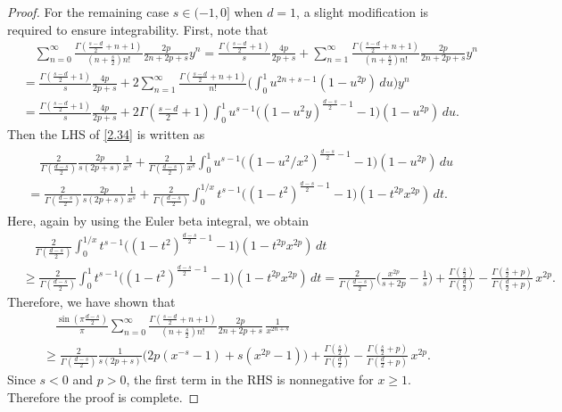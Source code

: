 \documentclass[10pt,a4paper]{amsart}
\begin{document}
\begin{proof}
For the remaining case $s \in (-1,0]$ when $d=1$, a slight modification is required to ensure integrability. First, note that 
\begin{align*}
&\quad \sum_{n=0}^\infty \frac{  \Gamma( \frac{s-d}{2}+n+1 )  }{  (n+\frac{s}{2}) n! }   \frac{2p}{2n+2p+s} y^{n} = \frac{  \Gamma( \frac{s-d}{2}+1 )  }{  s }   \frac{4p}{2p+s}+  \sum_{n=1}^\infty \frac{  \Gamma( \frac{s-d}{2}+n+1 )  }{  (n+\frac{s}{2}) n! }   \frac{2p}{2n+2p+s} y^{n} 
\\
&= \frac{  \Gamma( \frac{s-d}{2}+1 )  }{  s }   \frac{4p}{2p+s}+  2\sum_{n=1}^\infty \frac{  \Gamma( \frac{s-d}{2}+n+1 )  }{    n! }  \bigg(\int_0^1 u^{2n+s-1}(1-u^{2p})\,du \bigg)  y^n
\\
&=\frac{  \Gamma( \frac{s-d}{2}+1 )  }{  s }   \frac{4p}{2p+s}+ 2 \Gamma( \tfrac{s-d}{2}+1 ) \int_0^1 u^{s-1} \Big( (1-u^2y)^{ \frac{d-s}{2}-1 }-1\Big) (1-u^{2p})\,du .
\end{align*} 
Then the LHS of \eqref{2.34} is written as 
\begin{align}
\begin{split}
& \quad  \frac{2}{ \Gamma( \frac{d-s}{2} ) }  \frac{2p}{s(2p+s)} \frac{1}{x^s} + \frac{2}{ \Gamma( \frac{d-s}{2} ) } \frac{1}{x^s} \int_0^1 u^{s-1} \Big( (1-u^2/x^2)^{ \frac{d-s}{2}-1 } -1 \Big) (1-u^{2p})\,du
\\
&=  \frac{2}{ \Gamma( \frac{d-s}{2} ) }  \frac{2p}{s(2p+s)} \frac{1}{x^s} +  \frac{2}{ \Gamma( \frac{d-s}{2} ) }   \int_0^{1/x} t^{s-1} \Big( (1-t^2)^{ \frac{d-s}{2}-1 }-1\Big) (1-t^{2p}x^{2p})\,dt. 
\end{split}  
\end{align}
Here, again by using the Euler beta integral, we obtain  
\begin{align*}
&\quad \frac{2}{ \Gamma( \frac{d-s}{2} ) }   \int_0^{1/x} t^{s-1} \Big( (1-t^2)^{ \frac{d-s}{2}-1 }-1\Big) (1-t^{2p}x^{2p})\,dt 
\\
&\ge \frac{2}{ \Gamma( \frac{d-s}{2} ) }   \int_0^{1} t^{s-1} \Big( (1-t^2)^{ \frac{d-s}{2}-1 }-1\Big) (1-t^{2p}x^{2p})\,dt 
= \frac{2}{ \Gamma( \frac{d-s}{2} ) }\Big( \frac{x^{2p}}{s+2p} -\frac{1}{s}\Big)   + \frac{ \Gamma(\frac{s}{2})   }{ \Gamma(\frac{d}{2})  }   -    \frac{ \Gamma(\frac{s}{2}+p)   }{ \Gamma(\frac{d}{2}+p)  } \,      x^{2p}.
\end{align*}
Therefore, we have shown that 
\begin{align*}
&\quad  \frac{\sin(\pi\tfrac{d-s}{2})}{\pi} \sum_{n=0}^\infty \frac{  \Gamma( \frac{s-d}{2}+n+1 )  }{  (n+\frac{s}{2}) n! }   \frac{2p}{2n+2p+s}    \, \frac{1}{x^{2n+s}}
\\
& \ge \frac{2}{ \Gamma( \frac{d-s}{2} ) } \frac{1}{s(2p+s)} \Big( 2p(x^{-s}-1)+s (x^{2p}-1) \Big)  + \frac{ \Gamma(\frac{s}{2})   }{ \Gamma(\frac{d}{2})  }   -    \frac{ \Gamma(\frac{s}{2}+p)   }{ \Gamma(\frac{d}{2}+p)  } \,      x^{2p}.
\end{align*}
Since $s<0$ and $p>0$, the first term in the RHS is nonnegative for $x \ge 1$. Therefore the proof is complete. 
\end{proof}
\end{document}
